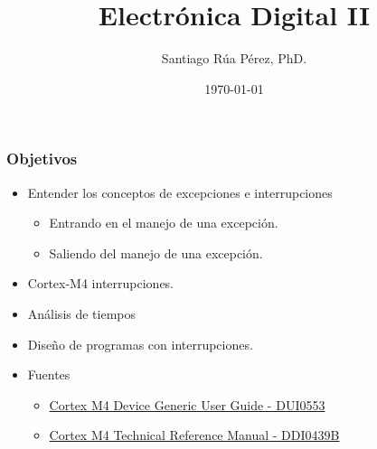\documentclass[10.5pt,scale=1.0,t,aspectratio=169,hyperref={pdfpagelabels=false}]{beamer}
\title{Electrónica Digital II}
\author{Santiago Rúa Pérez, PhD.}
\date{\today}
\begin{document}
	\begin{frame}
		\titlepage
	\end{frame}
	\frame{
		\begin{center}
			\LARGE \textcolor{blue}{INTERRUPCIONES}
		\end{center}
		
	}
	

\begin{frame}
	\frametitle{Objetivos}
	\begin{itemize}
		\item Entender los conceptos de excepciones e interrupciones
		\begin{itemize}
			\item Entrando en el manejo de una excepción.
			\item Saliendo del manejo de una excepción.
		\end{itemize}
		\item Cortex-M4 interrupciones.
		\item Análisis de tiempos
		\item Diseño de programas con interrupciones.
		\item Fuentes
		\begin{itemize}
			\item \href{https://developer.arm.com/documentation/dui0553/latest/}{Cortex M4 Device Generic User Guide - DUI0553}
			\item \href{https://developer.arm.com/documentation/ddi0439/b/}{Cortex M4 Technical Reference Manual - DDI0439B}
		\end{itemize}
	\end{itemize}
\end{frame}
\end{document}
